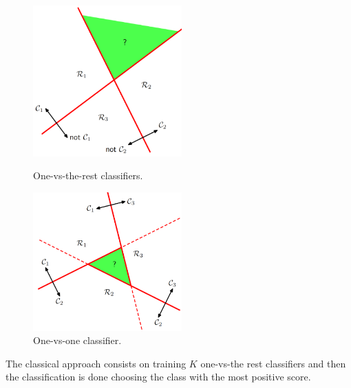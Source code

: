 \begin{figure}[!h]
	\begin{minipage}[t]{0.5\linewidth}
		\centering
		\includegraphics[width=0.51\textwidth]{img/onevsrest.png}
		\caption{One-vs-the-rest classifiers.}
	\end{minipage}
	\hspace{0.1cm}
	\begin{minipage}[t]{0.5\linewidth} 
		\centering
		\includegraphics[width=0.51\textwidth]{img/onevsone.png}
		\caption{One-vs-one classifier.}
	\end{minipage}        
\end{figure} 
The classical approach consists on training $K$ one-vs-the rest classifiers and then the classification is done choosing the class with the most positive score.

